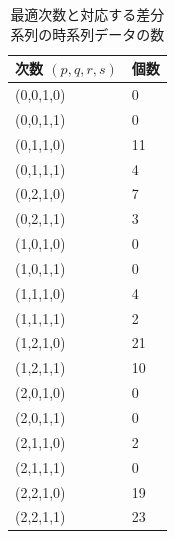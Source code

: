 \documentclass[a4j]{jarticle}
\begin{document}
\begin{table}[h]
\centering
\caption{最適次数と対応する差分系列の時系列データの数}
\label{count_diff}
\begin{tabular}{|l|l|}
\hline
次数 $(p,q,r,s)$ & 個数\\
\hline
(0,0,1,0) & 0\\
\hline
(0,0,1,1) & 0\\
\hline
(0,1,1,0) & 11\\
\hline
(0,1,1,1) & 4\\
\hline
(0,2,1,0) & 7\\
\hline
(0,2,1,1) & 3\\
\hline
(1,0,1,0) & 0\\
\hline
(1,0,1,1) & 0\\
\hline
(1,1,1,0) & 4\\
\hline
(1,1,1,1) & 2\\
\hline
(1,2,1,0) & 21\\
\hline
(1,2,1,1) & 10\\
\hline
(2,0,1,0) & 0\\
\hline
(2,0,1,1) & 0\\
\hline
(2,1,1,0) & 2\\
\hline
(2,1,1,1) & 0\\
\hline
(2,2,1,0) & 19\\
\hline
(2,2,1,1) & 23\\
\hline
\end{tabular}
\end{table}
\end{document}
